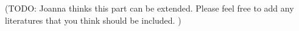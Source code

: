 \documentclass[preprint,12pt]{elsarticle}
\begin{document}
%
%
%






%


(TODO: Joanna thinks this part can be extended. Please feel free to add any literatures that you think should be included. )
\end{document}
